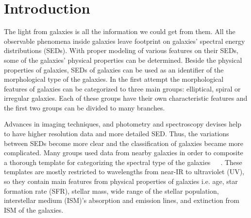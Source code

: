 \section{Introduction}
\label{sec: intro}
The light from galaxies is all the information we could get from them. 
All the observable phenomena inside galaxies leave footprint on galaxies' spectral energy distributions (SEDs).
With proper modeling of various features on their SEDs, some of the galaxies' physical properties can be determined.
Beside the physical properties of galaxies, SEDs of galaxies can be used as an identifier of the morphological type of the galaxies.
In the first attempt the morphological features of galaxies can be categorized to three main groups: elliptical, spiral or irregular galaxies.
Each of these groups have their own characteristic features and the first two groups can be divided to many branches.

Advances in imaging techniques, and photometry and spectroscopy devises help to have higher resolution data and more detailed SED. 
Thus, the variations between SEDs become more clear and the classification of galaxies became more complicated.
Many groups used data from nearby galaxies in order to composite a thorough template for categorizing the spectral type of the galaxies~\citep[e.g.][]{Kinney93}~\citep[][hereafter K96]{Kinney96}~\citep[][]{Bershady00}.%
These templates are mostly restricted to wavelengths from near-IR to ultraviolet (UV), so they contain main features from physical properties of galaxies i.e. age, star formation rate (SFR), stellar mass, wide range of the stellar population, interstellar medium (ISM)'s absorption and emission lines, and extinction from ISM of the galaxies. %

